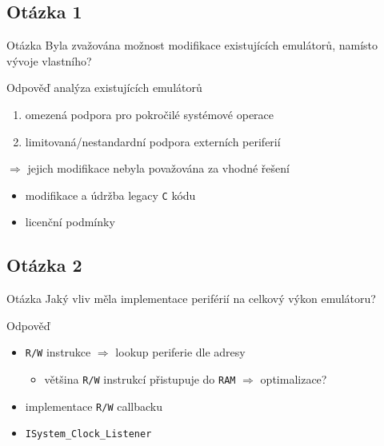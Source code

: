 \documentclass[compress]{beamer}
\begin{document}
\subsection{Otázka 1}

\begin{frame}
	\begin{block}{Otázka}
		Byla zvažována možnost modifikace existujících emulátorů, namísto vývoje vlastního?
	\end{block}
	\begin{block}{Odpověď}
		analýza existujících emulátorů
		\begin{enumerate}
			\item omezená podpora pro pokročilé systémové operace
			\item limitovaná/nestandardní podpora externích periferií
		\end{enumerate}
		\vspace{0.2cm}
		$\Rightarrow$ jejich modifikace nebyla považována za vhodné řešení
		\begin{itemize}
			\item modifikace a údržba legacy \texttt{C} kódu
			\item licenční podmínky
		\end{itemize}
	\end{block} 
\end{frame}

\subsection{Otázka 2}

\begin{frame}
	\begin{block}{Otázka}
		Jaký vliv měla implementace periférií na celkový výkon emulátoru?
	\end{block}
	\begin{block}{Odpověď}
		\begin{itemize}
			\item \texttt{R/W} instrukce $\Rightarrow$ lookup periferie dle adresy
			\begin{itemize}
				\item většina \texttt{R/W} instrukcí přistupuje do \texttt{RAM} $\Rightarrow$ optimalizace?
			\end{itemize}
			\item implementace \texttt{R/W} callbacku
			\item \texttt{ISystem\_Clock\_Listener} 
		\end{itemize}
	\end{block}
\end{frame}
\end{document}
